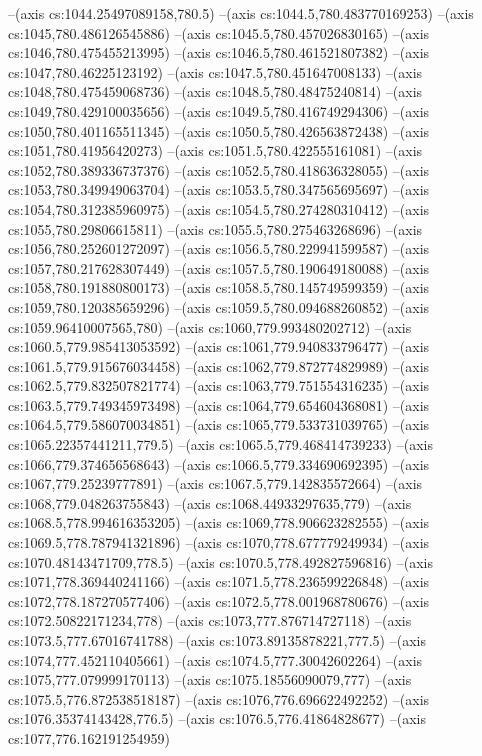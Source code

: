 --(axis cs:1044.25497089158,780.5)
--(axis cs:1044.5,780.483770169253)
--(axis cs:1045,780.486126545886)
--(axis cs:1045.5,780.457026830165)
--(axis cs:1046,780.475455213995)
--(axis cs:1046.5,780.461521807382)
--(axis cs:1047,780.46225123192)
--(axis cs:1047.5,780.451647008133)
--(axis cs:1048,780.475459068736)
--(axis cs:1048.5,780.48475240814)
--(axis cs:1049,780.429100035656)
--(axis cs:1049.5,780.416749294306)
--(axis cs:1050,780.401165511345)
--(axis cs:1050.5,780.426563872438)
--(axis cs:1051,780.41956420273)
--(axis cs:1051.5,780.422555161081)
--(axis cs:1052,780.389336737376)
--(axis cs:1052.5,780.418636328055)
--(axis cs:1053,780.349949063704)
--(axis cs:1053.5,780.347565695697)
--(axis cs:1054,780.312385960975)
--(axis cs:1054.5,780.274280310412)
--(axis cs:1055,780.29806615811)
--(axis cs:1055.5,780.275463268696)
--(axis cs:1056,780.252601272097)
--(axis cs:1056.5,780.229941599587)
--(axis cs:1057,780.217628307449)
--(axis cs:1057.5,780.190649180088)
--(axis cs:1058,780.191880800173)
--(axis cs:1058.5,780.145749599359)
--(axis cs:1059,780.120385659296)
--(axis cs:1059.5,780.094688260852)
--(axis cs:1059.96410007565,780)
--(axis cs:1060,779.993480202712)
--(axis cs:1060.5,779.985413053592)
--(axis cs:1061,779.940833796477)
--(axis cs:1061.5,779.915676034458)
--(axis cs:1062,779.872774829989)
--(axis cs:1062.5,779.832507821774)
--(axis cs:1063,779.751554316235)
--(axis cs:1063.5,779.749345973498)
--(axis cs:1064,779.654604368081)
--(axis cs:1064.5,779.586070034851)
--(axis cs:1065,779.533731039765)
--(axis cs:1065.22357441211,779.5)
--(axis cs:1065.5,779.468414739233)
--(axis cs:1066,779.374656568643)
--(axis cs:1066.5,779.334690692395)
--(axis cs:1067,779.25239777891)
--(axis cs:1067.5,779.142835572664)
--(axis cs:1068,779.048263755843)
--(axis cs:1068.44933297635,779)
--(axis cs:1068.5,778.994616353205)
--(axis cs:1069,778.906623282555)
--(axis cs:1069.5,778.787941321896)
--(axis cs:1070,778.677779249934)
--(axis cs:1070.48143471709,778.5)
--(axis cs:1070.5,778.492827596816)
--(axis cs:1071,778.369440241166)
--(axis cs:1071.5,778.236599226848)
--(axis cs:1072,778.187270577406)
--(axis cs:1072.5,778.001968780676)
--(axis cs:1072.50822171234,778)
--(axis cs:1073,777.876714727118)
--(axis cs:1073.5,777.67016741788)
--(axis cs:1073.89135878221,777.5)
--(axis cs:1074,777.452110405661)
--(axis cs:1074.5,777.30042602264)
--(axis cs:1075,777.079999170113)
--(axis cs:1075.18556090079,777)
--(axis cs:1075.5,776.872538518187)
--(axis cs:1076,776.696622492252)
--(axis cs:1076.35374143428,776.5)
--(axis cs:1076.5,776.41864828677)
--(axis cs:1077,776.162191254959)
